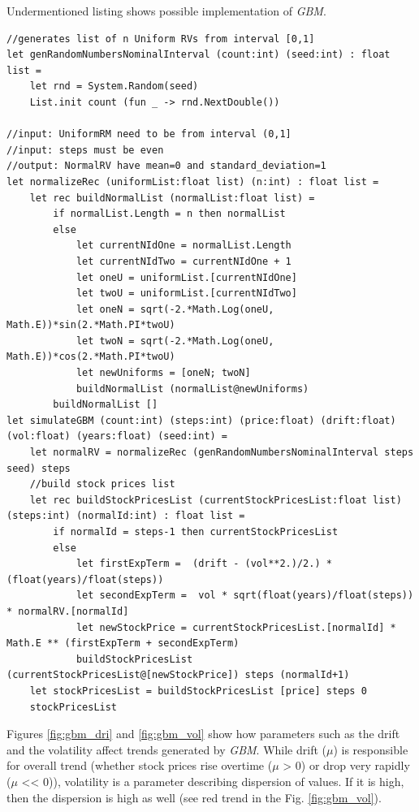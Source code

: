     Undermentioned listing shows possible implementation of \textit{GBM}.
    \begin{lstlisting}[caption=F\# implementation of \textit{Geometric Brownian Motion}.]
//generates list of n Uniform RVs from interval [0,1]
let genRandomNumbersNominalInterval (count:int) (seed:int) : float list =
    let rnd = System.Random(seed)
    List.init count (fun _ -> rnd.NextDouble())

//input: UniformRM need to be from interval (0,1]
//input: steps must be even
//output: NormalRV have mean=0 and standard_deviation=1
let normalizeRec (uniformList:float list) (n:int) : float list =
    let rec buildNormalList (normalList:float list) =
        if normalList.Length = n then normalList
        else
            let currentNIdOne = normalList.Length
            let currentNIdTwo = currentNIdOne + 1
            let oneU = uniformList.[currentNIdOne]
            let twoU = uniformList.[currentNIdTwo]
            let oneN = sqrt(-2.*Math.Log(oneU, Math.E))*sin(2.*Math.PI*twoU)
            let twoN = sqrt(-2.*Math.Log(oneU, Math.E))*cos(2.*Math.PI*twoU)
            let newUniforms = [oneN; twoN]
            buildNormalList (normalList@newUniforms)
        buildNormalList []
let simulateGBM (count:int) (steps:int) (price:float) (drift:float) (vol:float) (years:float) (seed:int) =
    let normalRV = normalizeRec (genRandomNumbersNominalInterval steps seed) steps
    //build stock prices list
    let rec buildStockPricesList (currentStockPricesList:float list) (steps:int) (normalId:int) : float list =
        if normalId = steps-1 then currentStockPricesList
        else
            let firstExpTerm =  (drift - (vol**2.)/2.) * (float(years)/float(steps))
            let secondExpTerm =  vol * sqrt(float(years)/float(steps)) * normalRV.[normalId]
            let newStockPrice = currentStockPricesList.[normalId] * Math.E ** (firstExpTerm + secondExpTerm)
            buildStockPricesList (currentStockPricesList@[newStockPrice]) steps (normalId+1)
    let stockPricesList = buildStockPricesList [price] steps 0
    stockPricesList
        \end{lstlisting}
    Figures \ref{fig:gbm_dri} and \ref{fig:gbm_vol} show how parameters such as the drift and the volatility affect trends generated by \textit{GBM}. While drift ($\mu$) is responsible for overall trend (whether stock prices rise overtime ($\mu$ > 0) or drop very rapidly ($\mu$ << 0)), volatility is a parameter describing dispersion of values. If it is high, then the dispersion is high as well (see red trend in the Fig. \ref{fig:gbm_vol}).
